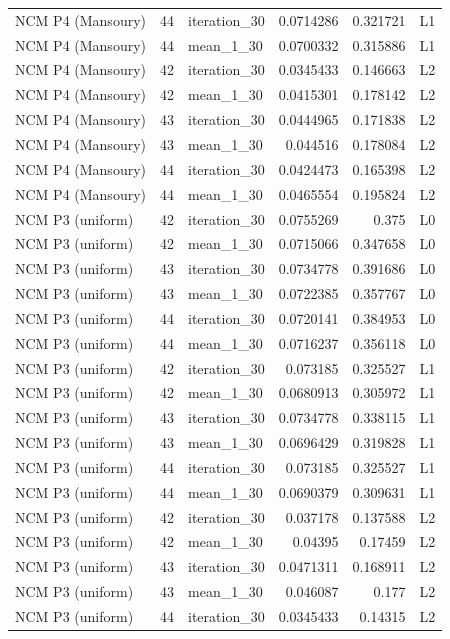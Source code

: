 \begin{table}[htbp!]
\begin{tabular}{lrlrrl}
NCM P4 (Mansoury) & 44 & iteration\_30 & 0.0714286 & 0.321721 & L1 \\
NCM P4 (Mansoury) & 44 & mean\_1\_30 & 0.0700332 & 0.315886 & L1 \\
NCM P4 (Mansoury) & 42 & iteration\_30 & 0.0345433 & 0.146663 & L2 \\
NCM P4 (Mansoury) & 42 & mean\_1\_30 & 0.0415301 & 0.178142 & L2 \\
NCM P4 (Mansoury) & 43 & iteration\_30 & 0.0444965 & 0.171838 & L2 \\
NCM P4 (Mansoury) & 43 & mean\_1\_30 & 0.044516 & 0.178084 & L2 \\
NCM P4 (Mansoury) & 44 & iteration\_30 & 0.0424473 & 0.165398 & L2 \\
NCM P4 (Mansoury) & 44 & mean\_1\_30 & 0.0465554 & 0.195824 & L2 \\
NCM P3 (uniform) & 42 & iteration\_30 & 0.0755269 & 0.375 & L0 \\
NCM P3 (uniform) & 42 & mean\_1\_30 & 0.0715066 & 0.347658 & L0 \\
NCM P3 (uniform) & 43 & iteration\_30 & 0.0734778 & 0.391686 & L0 \\
NCM P3 (uniform) & 43 & mean\_1\_30 & 0.0722385 & 0.357767 & L0 \\
NCM P3 (uniform) & 44 & iteration\_30 & 0.0720141 & 0.384953 & L0 \\
NCM P3 (uniform) & 44 & mean\_1\_30 & 0.0716237 & 0.356118 & L0 \\
NCM P3 (uniform) & 42 & iteration\_30 & 0.073185 & 0.325527 & L1 \\
NCM P3 (uniform) & 42 & mean\_1\_30 & 0.0680913 & 0.305972 & L1 \\
NCM P3 (uniform) & 43 & iteration\_30 & 0.0734778 & 0.338115 & L1 \\
NCM P3 (uniform) & 43 & mean\_1\_30 & 0.0696429 & 0.319828 & L1 \\
NCM P3 (uniform) & 44 & iteration\_30 & 0.073185 & 0.325527 & L1 \\
NCM P3 (uniform) & 44 & mean\_1\_30 & 0.0690379 & 0.309631 & L1 \\
NCM P3 (uniform) & 42 & iteration\_30 & 0.037178 & 0.137588 & L2 \\
NCM P3 (uniform) & 42 & mean\_1\_30 & 0.04395 & 0.17459 & L2 \\
NCM P3 (uniform) & 43 & iteration\_30 & 0.0471311 & 0.168911 & L2 \\
NCM P3 (uniform) & 43 & mean\_1\_30 & 0.046087 & 0.177 & L2 \\
NCM P3 (uniform) & 44 & iteration\_30 & 0.0345433 & 0.14315 & L2 \\

\end{tabular}
\end{table}
